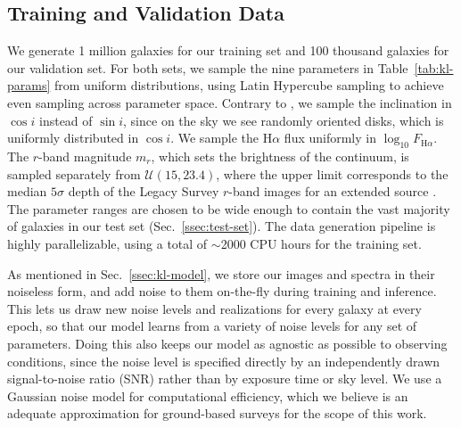 \subsection{Training and Validation Data}
\label{ssec:datasets}

We generate 1 million galaxies for our training set and 100 thousand galaxies for our validation set. For both sets, we sample the nine parameters in Table~\ref{tab:kl-params} from uniform distributions, using Latin Hypercube sampling to achieve even sampling across parameter space. Contrary to \citep{KLDESI}, we sample the inclination in $\cos i$ instead of $\sin i$, since on the sky we see randomly oriented disks, which is uniformly distributed in $\cos i$. We sample the H$\alpha$ flux uniformly in $\log_{10}F_{\mathrm{H}\alpha}$. The $r$-band magnitude $m_r$, which sets the brightness of the continuum, is sampled separately from $\mathcal{U}(15, 23.4)$, where the upper limit corresponds to the median $5\sigma$ depth of the Legacy Survey $r$-band images for an extended source \citep{KLDESI}. The parameter ranges are chosen to be wide enough to contain the vast majority of galaxies in our test set (Sec.~\ref{ssec:test-set}). The data generation pipeline is highly parallelizable, using a total of $\sim$2000 CPU hours for the training set.

As mentioned in Sec.~\ref{ssec:kl-model}, we store our images and spectra in their noiseless form, and add noise to them on-the-fly during training and inference. This lets us draw new noise levels and realizations for every galaxy at every epoch, so that our model learns from a variety of noise levels for any set of parameters. Doing this also keeps our model as agnostic  as possible to observing conditions, since the noise level is specified directly by an independently drawn signal-to-noise ratio (SNR) rather than by exposure time or sky level. We use a Gaussian noise model for computational efficiency, which we believe is an adequate approximation for ground-based surveys for the scope of this work.

